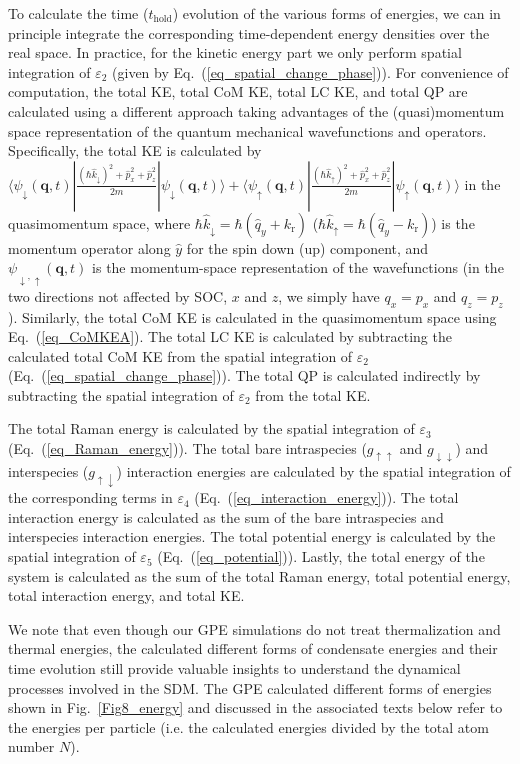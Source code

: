\documentclass[showpacs,preprintnumbers,amsmath,amssymb, superscriptaddress, aps, reprint]{revtex4-1}
\def\k_r{k_{\text{r}}}
\def\thold{t_{\text{hold}}}
\begin{document}
{{{To calculate the time ($\thold$) evolution of the various forms of energies, we can in principle integrate the corresponding time-dependent energy densities over the real space. In practice, for the kinetic energy part we only perform spatial integration of $\varepsilon_2$ (given by Eq.~(\ref{eq_spatial_change_phase})). For convenience of computation, the total KE, total CoM KE, total LC KE, and total QP are calculated using a different approach taking advantages of the (quasi)momentum space representation of the quantum mechanical wavefunctions and operators. Specifically, the total KE is calculated by $\langle\psi_{\downarrow}(\textbf{q},t)| \frac{(\hbar \hat{k}_{\downarrow})^2+\hat{p}_x^2+\hat{p}_z^2}{2m}|\psi_{\downarrow}(\textbf{q},t)\rangle+\langle\psi_{\uparrow}(\textbf{q},t)| \frac{(\hbar\hat{k}_{\uparrow})^2+\hat{p}_x^2+\hat{p}_z^2}{2m}|\psi_{\uparrow}(\textbf{q},t)\rangle$ in the quasimomentum space, where $\hbar \hat{k}_{\downarrow}=\hbar(\hat{q}_y+\k_r)$ ($\hbar \hat{k}_{\uparrow}=\hbar(\hat{q}_y-\k_r)$) is the momentum operator along $\hat{y}$ for the spin down (up) component, and $\psi_{\downarrow, \uparrow}(\textbf{q},t)$ is the momentum-space representation of the wavefunctions (in the two directions not affected by SOC, $x$ and $z$, we simply have $q_x=p_x$ and $q_z=p_z$). Similarly, the total CoM KE is calculated in the quasimomentum space using Eq.~(\ref{eq_CoMKEA}). The total LC KE is calculated by subtracting the calculated total CoM KE from the spatial integration of $\varepsilon_2$ (Eq.~(\ref{eq_spatial_change_phase})). The total QP is calculated indirectly by subtracting the spatial integration of $\varepsilon_2$ from the total KE. 

The total Raman energy is calculated by the spatial integration of $\varepsilon_3$ (Eq.~(\ref{eq_Raman_energy})). The total bare intraspecies ($g_{\uparrow\uparrow}$ and $g_{\downarrow\downarrow}$) and interspecies ($g_{\uparrow\downarrow}$) interaction energies are calculated by the spatial integration of the corresponding terms in $\varepsilon_4$ (Eq.~(\ref{eq_interaction_energy})). The total interaction energy is calculated as the sum of the bare intraspecies and interspecies interaction energies. The total potential energy is calculated by the spatial integration of $\varepsilon_5$ (Eq.~(\ref{eq_potential})). Lastly, the total energy of the system is calculated as the sum of the total Raman energy, total potential energy, total interaction energy, and total KE.

We note that even though our GPE simulations do not treat thermalization and thermal energies, the calculated different forms of condensate energies and their time evolution still provide valuable insights to understand the dynamical processes involved in the SDM. The GPE calculated different forms of energies shown in {Fig.~{\ref{Fig8_energy}}} and discussed in the associated texts below refer to the energies per particle (i.e. the calculated energies divided by the total atom number $N$).

}}}
\end{document}
